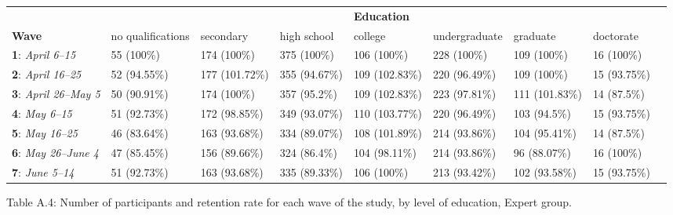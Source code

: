 \documentclass[authordate, empirical]{jote-new-article}
\begin{document}
	\begin{table}
		\begin{tabularx}{\linewidth}{@{} l l l l l l l l l @{}}
			\hline  &  &  &  & \textbf{Education} &  &  &  \\

			 \textbf{Wave} & no qualifications & secondary & high school & college &
			undergraduate & graduate & doctorate \\

			\hline \textbf{1}: \emph{April 6–15} & 55 (100\%) & 174 (100\%) & 375 (100\%)
			& 106 (100\%) & 228 (100\%) & 109 (100\%) & 16 (100\%) \\

			 \textbf{2}: \emph{April 16–25} & 52 (94.55\%) & 177 (101.72\%) & 355 (94.67\%)
			& 109 (102.83\%) & 220 (96.49\%) & 109 (100\%) & 15 (93.75\%) \\

			 \textbf{3}: \emph{April 26–May 5} & 50 (90.91\%) & 174 (100\%) & 357 (95.2\%)
			& 109 (102.83\%) & 223 (97.81\%) & 111 (101.83\%) & 14 (87.5\%) \\

			 \textbf{4}: \emph{May 6–15} & 51 (92.73\%) & 172 (98.85\%) & 349 (93.07\%) &
			110 (103.77\%) & 220 (96.49\%) & 103 (94.5\%) & 15 (93.75\%) \\

			 \textbf{5}: \emph{May 16–25} & 46 (83.64\%) & 163 (93.68\%) & 334 (89.07\%) &
			108 (101.89\%) & 214 (93.86\%) & 104 (95.41\%) & 14 (87.5\%) \\

			 \textbf{6}: \emph{May 26–June 4} & 47 (85.45\%) & 156 (89.66\%) & 324 (86.4\%)
			& 104 (98.11\%) & 214 (93.86\%) & 96 (88.07\%) & 16 (100\%) \\

			 \textbf{7}: \emph{June 5–14} & 51 (92.73\%) & 163 (93.68\%) & 335 (89.33\%) &
			106 (100\%) & 213 (93.42\%) & 102 (93.58\%) & 15 (93.75\%) \\


		\end{tabularx}
	\end{table}

	Table A.4: Number of participants and retention rate for each wave of the study, by level of education, Expert group.
\end{document}
